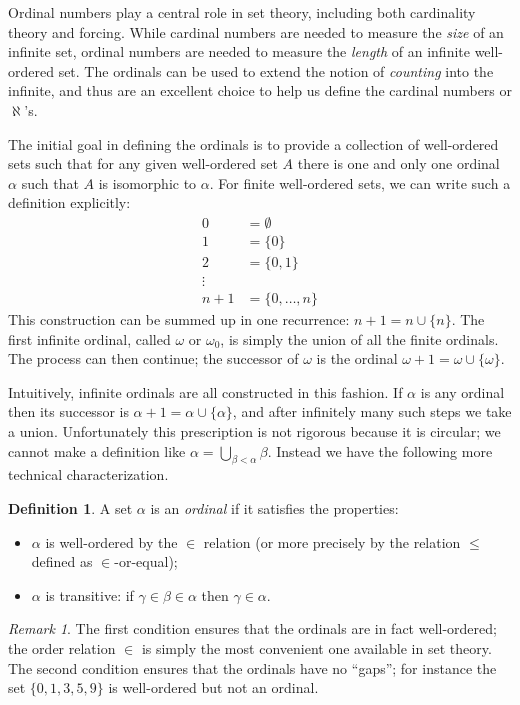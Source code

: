 \documentclass[11pt,oneside]{amsbook}
\theoremstyle{definition}
\theoremstyle{plain}
\theoremstyle{definition}
\newtheorem{definition}[theorem]{Definition}
\theoremstyle{remark}
\newtheorem{remark}[theorem]{Remark}
\numberwithin{equation}{section}
\numberwithin{figure}{section}
\begin{document}
Ordinal numbers play a central role in set theory, including both cardinality theory and forcing. While cardinal numbers are needed to measure the \emph{size} of an infinite set, ordinal numbers are needed to measure the \emph{length} of an infinite well-ordered set. The ordinals can be used to extend the notion of \emph{counting} into the infinite, and thus are an excellent choice to help us define the cardinal numbers or $\aleph$'s.

The initial goal in defining the ordinals is to provide a collection of well-ordered sets such that for any given well-ordered set $A$ there is one and only one ordinal $\alpha$ such that $A$ is isomorphic to $\alpha$. For finite well-ordered sets, we can write such a definition explicitly:
\begin{align*}
0&=\emptyset\\
1&=\{0\}\\
2&=\{0,1\}\\
\vdots\\
n+1&=\{0,\ldots,n\}
\end{align*}
This construction can be summed up in one recurrence: $n+1=n\cup\{n\}$. The first infinite ordinal, called $\omega$ or $\omega_0$, is simply the union of all the finite ordinals. The process can then continue; the successor of $\omega$ is the ordinal $\omega+1=\omega\cup\{\omega\}$.

Intuitively, infinite ordinals are all constructed in this fashion. If $\alpha$ is any ordinal then its successor is $\alpha+1=\alpha\cup\{\alpha\}$, and after infinitely many such steps we take a union. Unfortunately this prescription is not rigorous because it is circular; we cannot make a definition like $\alpha=\bigcup_{\beta<\alpha}\beta$. Instead we have the following more technical characterization.

\begin{definition}
  \label{defn:ordinals}
  A set $\alpha$ is an \emph{ordinal} if it satisfies the properties:
  \begin{itemize}
  \item $\alpha$ is well-ordered by the $\in$ relation (or more precisely by the relation $\leq$ defined as $\in$-or-equal);
  \item $\alpha$ is transitive: if $\gamma\in\beta\in\alpha$ then $\gamma\in\alpha$.
  \end{itemize}
\end{definition}

\begin{remark}
The first condition ensures that the ordinals are in fact well-ordered; the order relation $\in$ is simply the most convenient one available in set theory. The second condition ensures that the ordinals have no ``gaps''; for instance the set $\{0,1,3,5,9\}$ is well-ordered but not an ordinal.
\end{remark}
\end{document}
